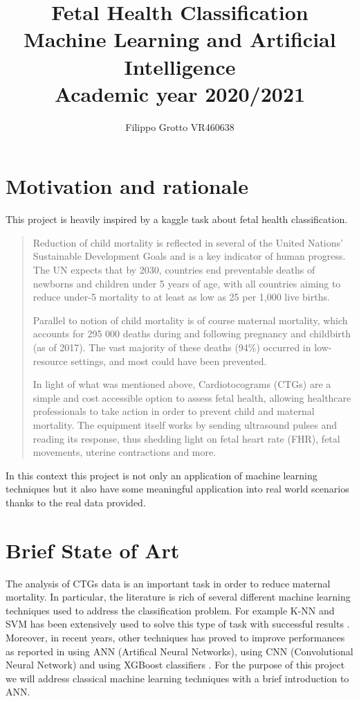\documentclass[a4paper,12pt]{article}
\begin{document}
\author{Filippo Grotto VR460638}

\title{Fetal Health Classification  \\[1ex] \large Machine Learning and Artificial Intelligence \\[1ex] \large Academic year 2020/2021}

\maketitle
\newpage
\tableofcontents
\newpage

\section{Motivation and rationale}
This project is heavily inspired by a kaggle task \cite{kaggle} about fetal health classification.
\begin{quote}
Reduction of child mortality is reflected in several of the United Nations' Sustainable Development Goals and is a key indicator of human progress.
The UN expects that by 2030, countries end preventable deaths of newborns and children under 5 years of age, with all countries aiming to reduce under‑5 mortality to at least as low as 25 per 1,000 live births.

Parallel to notion of child mortality is of course maternal mortality, which accounts for 295 000 deaths during and following pregnancy and childbirth (as of 2017). The vast majority of these deaths (94\%) occurred in low-resource settings, and most could have been prevented.

In light of what was mentioned above, Cardiotocograms (CTGs) are a simple and cost accessible option to assess fetal health, allowing healthcare professionals to take action in order to prevent child and maternal mortality. The equipment itself works by sending ultrasound pulses and reading its response, thus shedding light on fetal heart rate (FHR), fetal movements, uterine contractions and more.
\end{quote}
In this context this project is not only an application of machine learning techniques but it also have some meaningful application into real world scenarios thanks to the real data provided.

\section{Brief State of Art}
The analysis of CTGs data is an important task in order to reduce maternal mortality. In particular, the literature is rich of several different machine learning techniques used to address the classification problem. For example K-NN and SVM has been extensively used to solve this type of task with successful results \cite{ml}. Moreover, in recent years, other techniques has proved to improve performances as reported in \cite{ann} using ANN (Artifical Neural Networks), using CNN (Convolutional Neural Network) \cite{cnn} and using XGBoost classifiers \cite{ml}. For the purpose of this project we will address classical machine learning techniques with a brief introduction to ANN. 
\end{document}
